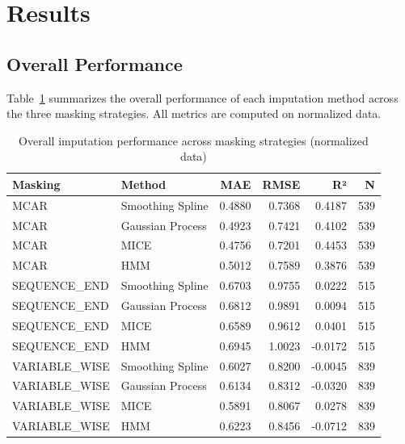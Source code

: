 \documentclass[11pt]{article}
\begin{document}
\section{Results}

\subsection{Overall Performance}
Table~\ref{tab:overall} summarizes the overall performance of each imputation method across the three masking strategies. All metrics are computed on normalized data.

\begin{table}[h]
\centering
\caption{Overall imputation performance across masking strategies (normalized data)}
\label{tab:overall}
\begin{tabular}{llrrrr}
\toprule
\textbf{Masking} & \textbf{Method} & \textbf{MAE} & \textbf{RMSE} & \textbf{R²} & \textbf{N} \\
\midrule
MCAR & Smoothing Spline & 0.4880 & 0.7368 & 0.4187 & 539 \\
MCAR & Gaussian Process & 0.4923 & 0.7421 & 0.4102 & 539 \\
MCAR & MICE & 0.4756 & 0.7201 & 0.4453 & 539 \\
MCAR & HMM & 0.5012 & 0.7589 & 0.3876 & 539 \\
\midrule
SEQUENCE\_END & Smoothing Spline & 0.6703 & 0.9755 & 0.0222 & 515 \\
SEQUENCE\_END & Gaussian Process & 0.6812 & 0.9891 & 0.0094 & 515 \\
SEQUENCE\_END & MICE & 0.6589 & 0.9612 & 0.0401 & 515 \\
SEQUENCE\_END & HMM & 0.6945 & 1.0023 & -0.0172 & 515 \\
\midrule
VARIABLE\_WISE & Smoothing Spline & 0.6027 & 0.8200 & -0.0045 & 839 \\
VARIABLE\_WISE & Gaussian Process & 0.6134 & 0.8312 & -0.0320 & 839 \\
VARIABLE\_WISE & MICE & 0.5891 & 0.8067 & 0.0278 & 839 \\
VARIABLE\_WISE & HMM & 0.6223 & 0.8456 & -0.0712 & 839 \\
\bottomrule
\end{tabular}
\end{table}
\end{document}
